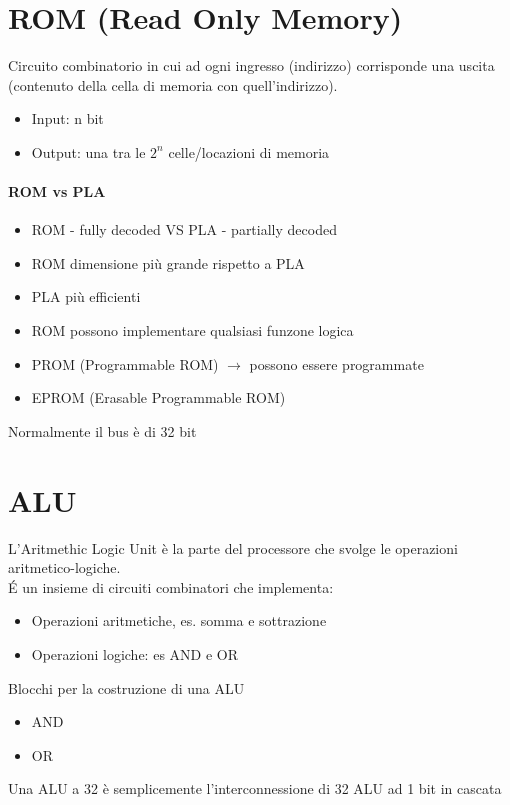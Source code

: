 \documentclass[12pt, a4paper, openany]{book}
\begin{document}
\section{ROM (Read Only Memory)}
Circuito combinatorio in cui ad ogni ingresso (indirizzo)
corrisponde una uscita (contenuto della cella di memoria con quell'indirizzo).
\begin{itemize}
    \item Input: n bit
    \item Output: una tra le $2^n$ celle/locazioni di memoria
\end{itemize}

\paragraph{ROM vs PLA}
\begin{itemize}
    \item ROM - fully decoded VS PLA - partially decoded
    \item ROM dimensione più grande rispetto a PLA
    \item PLA più efficienti
    \item ROM possono implementare qualsiasi funzone logica
\end{itemize}

\begin{itemize}
    \item PROM (Programmable ROM) $\to$ possono essere programmate
    \item EPROM (Erasable Programmable ROM)
\end{itemize}

Normalmente il bus è di 32 bit

\section{ALU}
L'Aritmethic Logic Unit è la parte del processore che svolge le operazioni
aritmetico-logiche.
\\\'E un insieme di circuiti combinatori che implementa:
\begin{itemize}
    \item Operazioni aritmetiche, es. somma e sottrazione
    \item Operazioni logiche: es AND e OR
\end{itemize}
Blocchi per la costruzione di una ALU
\begin{itemize}
    \item AND
    \item OR
\end{itemize}
Una ALU a 32 è semplicemente l'interconnessione di 32 ALU ad 1 bit in cascata
\end{document}
